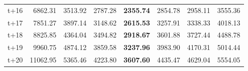 \begin{table}[H]
\begin{tabular}{lrrrrrrr}
t+16  & 6862.31  & 3513.92  & 2787.28  & \textbf{2355.74}  & 2854.78  & 2958.11  & 3555.36  \\
t+17  & 7851.27  & 3897.14  & 3148.62  & \textbf{2615.53}  & 3257.91  & 3338.33  & 4018.13  \\
t+18  & 8825.85  & 4364.04  & 3494.82  & \textbf{2918.67}  & 3601.88  & 3727.44  & 4488.78  \\
t+19  & 9960.75  & 4874.12  & 3859.58  & \textbf{3237.96}  & 3983.90  & 4170.31  & 5014.44  \\
t+20  & 11062.95  & 5365.46  & 4223.80  & \textbf{3607.60}  & 4435.47  & 4629.04  & 5554.05  \\

\bottomrule
\end{tabular}
\end{table}
